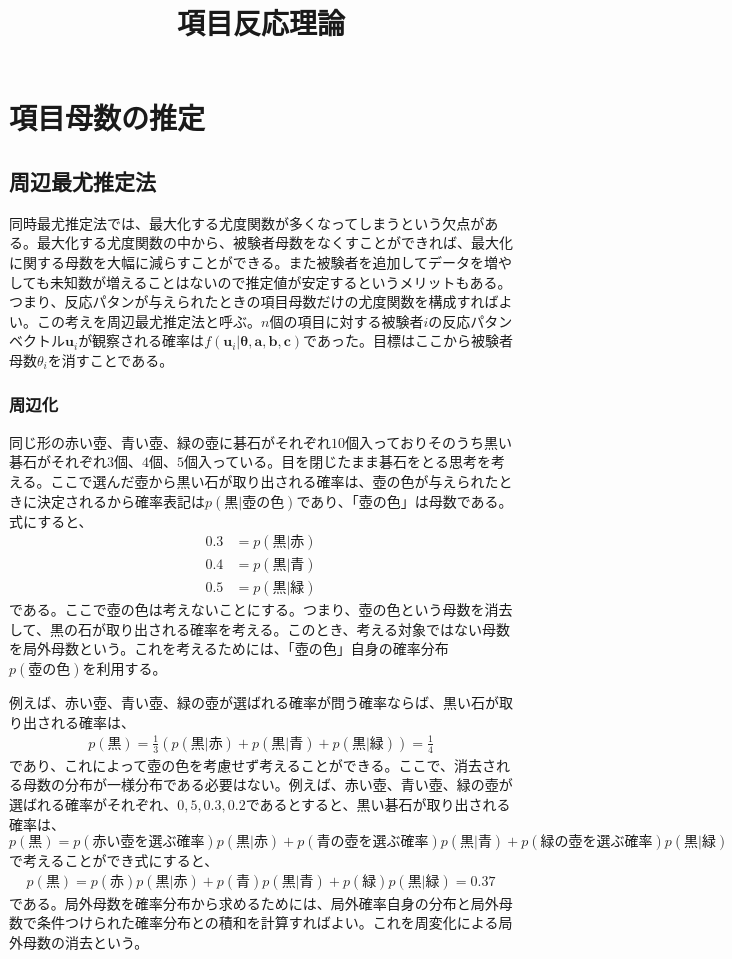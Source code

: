 \documentclass[12pt]{jarticle}
\title{項目反応理論}
\begin{document}
\maketitle
\setcounter{section}{3}
\section{項目母数の推定}
\setcounter{subsection}{1}
\subsection{周辺最尤推定法}
同時最尤推定法では、最大化する尤度関数が多くなってしまうという欠点がある。最大化する尤度関数の中から、被験者母数をなくすことができれば、最大化に関する母数を大幅に減らすことができる。また被験者を追加してデータを増やしても未知数が増えることはないので推定値が安定するというメリットもある。つまり、反応パタンが与えられたときの項目母数だけの尤度関数を構成すればよい。この考えを周辺最尤推定法と呼ぶ。$n$個の項目に対する被験者$i$の反応パタンベクトル$\boldsymbol{u}_i$が観察される確率は$f(\boldsymbol{u}_i|\boldsymbol{\theta},\boldsymbol{a,b,c})$であった。目標はここから被験者母数$\theta_i$を消すことである。
\subsubsection{周辺化}
同じ形の赤い壺、青い壺、緑の壺に碁石がそれぞれ$10$個入っておりそのうち黒い碁石がそれぞれ$3$個、$4$個、$5$個入っている。目を閉じたまま碁石をとる思考を考える。ここで選んだ壺から黒い石が取り出される確率は、壺の色が与えられたときに決定されるから確率表記は$\displaystyle p(黒|壺の色)$であり、「壺の色」は母数である。式にすると、
\begin{align*}
  \label{00}
  \displaystyle 0.3 &= p(黒|赤) \tag{4.15}\\
  0.4 &= p(黒|青) \tag{4.16} \\
  0.5 &=  p(黒|緑)\tag{4.17}
\end{align*}
である。ここで壺の色は考えないことにする。つまり、壺の色という母数を消去して、黒の石が取り出される確率を考える。このとき、考える対象ではない母数を局外母数という。これを考えるためには、「壺の色」自身の確率分布$p(壺の色)$を利用する。

例えば、赤い壺、青い壺、緑の壺が選ばれる確率が問う確率ならば、黒い石が取り出される確率は、
\begin{align}
  \label{01}
  \displaystyle p(黒) = \frac{1}{3}(p(黒|赤) + p(黒|青) +p(黒|緑) ) = \frac{1}{4} \tag{4.18}
\end{align}
であり、これによって壺の色を考慮せず考えることができる。ここで、消去される母数の分布が一様分布である必要はない。例えば、赤い壺、青い壺、緑の壺が選ばれる確率がそれぞれ、$0,5,0.3,0.2$であるとすると、黒い碁石が取り出される確率は、$\displaystyle  p(黒) = p(赤い壺を選ぶ確率)p(黒|赤) + p(青の壺を選ぶ確率)p(黒|青) + p(緑の壺を選ぶ確率)p(黒|緑) $で考えることができ式にすると、
\begin{align}
  \label{02}
  \displaystyle  p(黒) = p(赤)p(黒|赤) + p(青)p(黒|青) + p(緑)p(黒|緑)  = 0.37 \tag{4.19}
\end{align}
である。局外母数を確率分布から求めるためには、局外確率自身の分布と局外母数で条件つけられた確率分布との積和を計算すればよい。これを周変化による局外母数の消去という。
\end{document}
